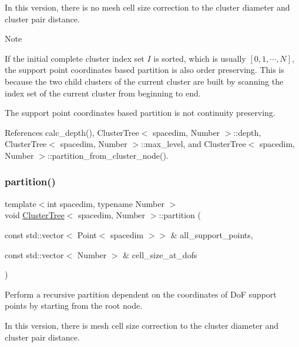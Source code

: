 In this version, there is no mesh cell size correction to the cluster diameter and cluster pair distance.


\begin{DoxyDescription}
\item[Note ]
\begin{DoxyEnumerate}
\item If the initial complete cluster index set $I$ is sorted, which is usually $[0, 1, \cdots, N]$, the support point coordinates based partition is also order preserving. This is because the two child clusters of the current cluster are built by scanning the index set of the current cluster from beginning to end.
\item The support point coordinates based partition is not continuity preserving.  
\end{DoxyEnumerate}
\end{DoxyDescription}

References calc\+\_\+depth(), Cluster\+Tree$<$ spacedim, Number $>$\+::depth, Cluster\+Tree$<$ spacedim, Number $>$\+::max\+\_\+level, and Cluster\+Tree$<$ spacedim, Number $>$\+::partition\+\_\+from\+\_\+cluster\+\_\+node().

\mbox{\label{classClusterTree_a4d2682986352bb1e44bc73ebfc5a9fdf}} 
\subsubsection{\texorpdfstring{partition()}{partition()}\hspace{0.1cm}{\footnotesize\ttfamily [3/3]}}
{\footnotesize\ttfamily template$<$int spacedim, typename Number $>$ \\
void \hyperlink{classClusterTree}{Cluster\+Tree}$<$ spacedim, Number $>$\+::partition (\begin{DoxyParamCaption}\item[{const std\+::vector$<$ Point$<$ spacedim $>$$>$ \&}]{all\+\_\+support\+\_\+points,  }\item[{const std\+::vector$<$ Number $>$ \&}]{cell\+\_\+size\+\_\+at\+\_\+dofs }\end{DoxyParamCaption})}

Perform a recursive partition dependent on the coordinates of DoF support points by starting from the root node.

In this version, there is mesh cell size correction to the cluster diameter and cluster pair distance.


